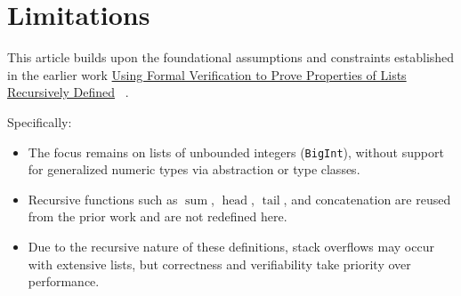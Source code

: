 \section{Limitations}
\label{sec:limitations}

This article builds upon the foundational assumptions and constraints
established in the earlier work
\href{https://rxiverse.org/abs/2609.0023}{Using
Formal Verification to Prove Properties of Lists Recursively Defined}~%
\cite{mata2026lists}.

Specifically:

\begin{itemize}
  \item The focus remains on lists of unbounded integers
    (\texttt{BigInt}), without support for generalized numeric types via
    abstraction or type classes.
  \item Recursive functions such as $\operatorname{sum}$,
    $\operatorname{head}$, $\operatorname{tail}$, and concatenation are
    reused from the prior work \cite{mata2026lists} and are not redefined
    here.
  \item Due to the recursive nature of these definitions, stack overflows
    may occur with extensive lists, but correctness and verifiability take
    priority over performance.
\end{itemize}
